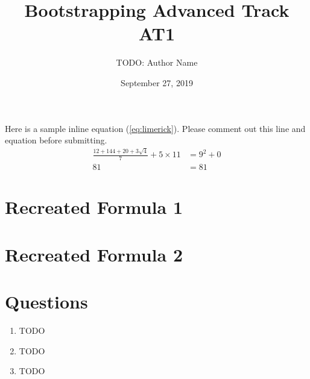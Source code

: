 \documentclass[12pt]{article}
\begin{document}
\title{Bootstrapping Advanced Track AT1}
\author{TODO: Author Name}
\date{September 27, 2019}

\maketitle





Here is a sample inline equation (\ref{eq:limerick}). Please comment out this line and equation before submitting.
\begin{align} \label{eq:limerick}
\frac{12 + 144 + 20 + 3\sqrt{4}}{7} + 5 \times 11 &= 9^2 + 0 \\
81 &= 81
\end{align}



\section{Recreated Formula 1}



\section{Recreated Formula 2}





\section*{Questions}


\begin{enumerate}
  \item TODO

  \item TODO

  \item TODO


\end{enumerate}
\end{document}
